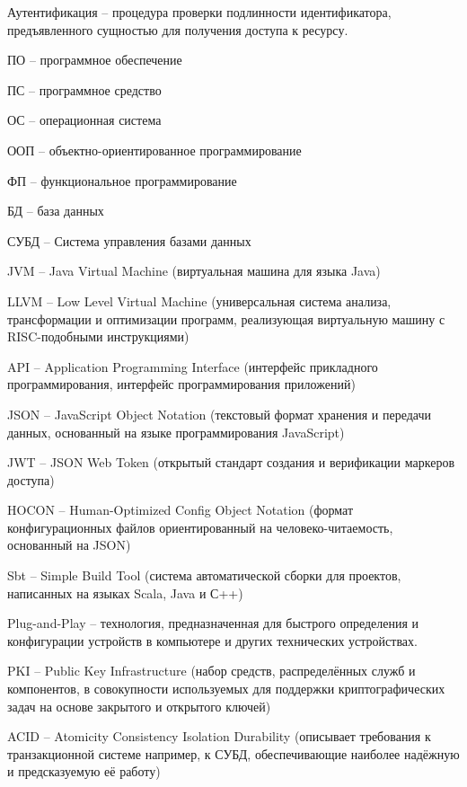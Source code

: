 
Аутентификация -- процедура проверки подлинности идентификатора, предъявленного сущностью для получения доступа к ресурсу.

ПО -- программное обеспечение

ПС -- программное средство

ОС -- операционная система

ООП -- объектно-ориентированное программирование

ФП -- функциональное программирование

БД -- база данных

СУБД -- Система управления базами данных

JVM -- Java Virtual Machine (виртуальная машина для языка Java)

LLVM -- Low Level Virtual Machine (универсальная система анализа, трансформации и оптимизации программ, реализующая виртуальную машину с RISC-подобными инструкциями)

API -- Application Programming Interface (интерфейс прикладного программирования, интерфейс программирования приложений)

JSON -- JavaScript Object Notation (текстовый формат хранения и передачи данных, основанный на языке программирования JavaScript)

JWT -- JSON Web Token (открытый стандарт создания и верификации маркеров доступа)

HOCON -- Human-Optimized Config Object Notation (формат конфигурационных файлов ориентированный на человеко-читаемость, основанный на JSON)

Sbt -- Simple Build Tool (система автоматической сборки для проектов, написанных на языках Scala, Java и С++)

Plug-and-Play -- технология, предназначенная для быстрого определения и конфигурации устройств в компьютере и других технических устройствах.

PKI -- Public Key Infrastructure (набор средств, распределённых служб и компонентов, в совокупности используемых для поддержки криптографических задач на основе закрытого и открытого ключей)

ACID -- Atomicity Consistency Isolation Durability  (описывает требования к транзакционной системе например, к СУБД, обеспечивающие наиболее надёжную и предсказуемую её работу)

\clearpage